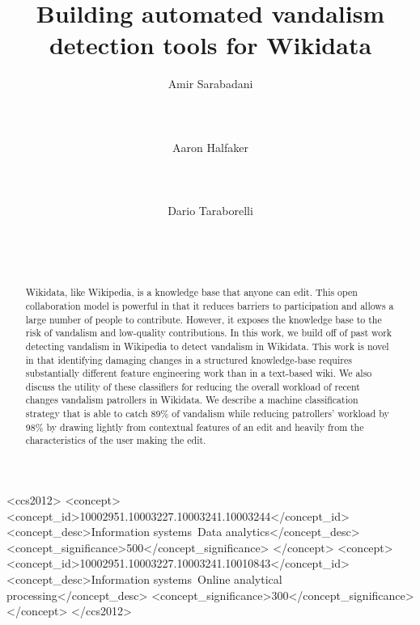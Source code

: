 \documentclass{sig-alternate}
\begin{document}

\title{Building automated vandalism detection tools for Wikidata}

\author{
\alignauthor Amir Sarabadani\\
\\
\\
\\
\alignauthor Aaron Halfaker\\
\\
\\
\\
\alignauthor Dario Taraborelli\\
\\
\\
\\
}

\maketitle
\begin{abstract}
Wikidata, like Wikipedia, is a knowledge base that anyone can edit.  This open collaboration model is powerful in that it reduces barriers to participation and allows a large number of people to contribute. However, it exposes the knowledge base to the risk of vandalism and low-quality contributions.  In this work, we build off of past work detecting vandalism in Wikipedia to detect vandalism in Wikidata.  This work is novel in that identifying damaging changes in a structured knowledge-base requires substantially different feature engineering work than in a text-based wiki.  We also discuss the utility of these classifiers for reducing the overall workload of recent changes vandalism patrollers in Wikidata.  We describe a machine classification strategy that is able to catch 89\% of vandalism while reducing patrollers' workload by 98\% by drawing lightly from contextual features of an edit and heavily from the characteristics of the user making the edit.
\end{abstract}

\begin{CCSXML}
<ccs2012>
<concept>
<concept_id>10002951.10003227.10003241.10003244</concept_id>
<concept_desc>Information systems~Data analytics</concept_desc>
<concept_significance>500</concept_significance>
</concept>
<concept>
<concept_id>10002951.10003227.10003241.10010843</concept_id>
<concept_desc>Information systems~Online analytical processing</concept_desc>
<concept_significance>300</concept_significance>
</concept>
</ccs2012>
\end{CCSXML}
\end{document}
